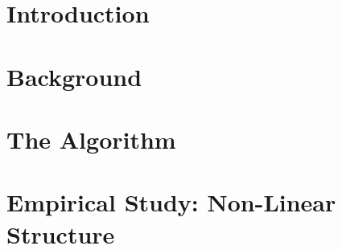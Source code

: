\documentclass[10pt]{article} %
\theoremstyle{plain}
\theoremstyle{definition}
\theoremstyle{remark}
\begin{document}
\begin{abstract}
\end{abstract}

\vspace*{-0.5em}
\section{Introduction}
\vspace*{-0.5em}
\label{sec:intro}



\section{Background}
\label{sec:prelim}


\section{The \pred Algorithm}
\label{sec:algo}


\vspace*{-0.3em}
\section{Empirical Study: Non-Linear Structure}
\vspace*{-0.3em}
\label{sec:short-horizon}

\end{document}
